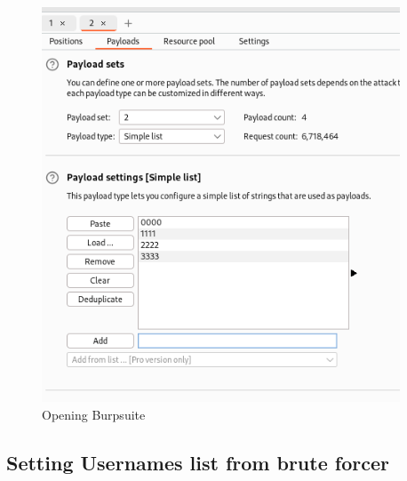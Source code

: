 \documentclass[11pt]{article}
\begin{document}
\begin{figure}[H]
    \centering
    \includegraphics[width=0.95\textwidth]{burpsuite (7).png}
    \caption{Opening Burpsuite}
    \label{fig:1}
\end{figure}
\subsection{Setting Usernames list from brute forcer}


\end{document}
